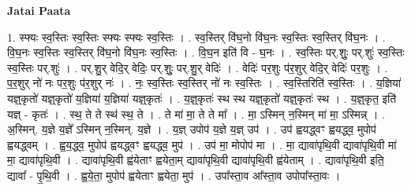 \documentclass[17pt]{extarticle}
\begin{document}
\textbf{Jatai Paata} \newline

1. स्फ्यः स्व॒स्तिः स्व॒स्तिः स्फ्यः स्फ्यः स्व॒स्तिः । . स्व॒स्तिर् वि॑घ॒नो वि॑घ॒नः स्व॒स्तिः स्व॒स्तिर् वि॑घ॒नः । . वि॒घ॒नः स्व॒स्तिः स्व॒स्तिर् वि॑घ॒नो वि॑घ॒नः स्व॒स्तिः । . वि॒घ॒न इति॑ वि - घ॒नः । . स्व॒स्तिः पर्.शुः॒ पर्.शुः॑ स्व॒स्तिः स्व॒स्तिः पर्.शुः॑ । . पर्.शु॒र् वेदि॒र् वेदिः॒ पर्.शुः॒ पर्.शु॒र् वेदिः॑ । . वेदिः॑ पर॒शुः प॑र॒शुर् वेदि॒र् वेदिः॑ पर॒शुः । . प॒र॒शुर् नो॑ नः पर॒शुः प॑र॒शुर् नः॑ । . नः॒ स्व॒स्तिः स्व॒स्तिर् नो॑ नः स्व॒स्तिः । . स्व॒स्तिरिति॑ स्व॒स्तिः । . य॒ज्ञिया॑ यज्ञ्॒कृतो॑ यज्ञ्॒कृतो॑ य॒ज्ञिया॑ य॒ज्ञिया॑ यज्ञ्॒कृतः॑ । . य॒ज्ञ्॒कृतः॑ स्थ स्थ यज्ञ्॒कृतो॑ यज्ञ्॒कृतः॑ स्थ । . य॒ज्ञ्॒कृत॒ इति॑ यज्ञ् - कृतः॑ । . स्थ॒ ते ते स्थ॑ स्थ॒ ते । . ते मा॑ मा॒ ते ते मा᳚ । . मा॒ ऽस्मिन् न॒स्मिन् मा॑ मा॒ ऽस्मिन्न् । . अ॒स्मिन्. य॒ज्ञे य॒ज्ञे᳚ ऽस्मिन् न॒स्मिन्. य॒ज्ञे । . य॒ज्ञ् उपोप॑ य॒ज्ञे य॒ज्ञ् उप॑ । . उप॑ ह्वयद्ध्वꣳ ह्वयद्ध्व॒ मुपोप॑ ह्वयद्ध्वम् । . ह्व॒य॒द्ध्व॒ मुपोप॑ ह्वयद्ध्वꣳ ह्वयद्ध्व॒ मुप॑ । . उप॑ मा॒ मोपोप॑ मा । . मा॒ द्यावा॑पृथि॒वी द्यावा॑पृथि॒वी मा॑ मा॒ द्यावा॑पृथि॒वी । . द्यावा॑पृथि॒वी ह्व॑येताꣳ ह्वयेता॒म् द्यावा॑पृथि॒वी द्यावा॑पृथि॒वी ह्व॑येताम् । . द्यावा॑पृथि॒वी इति॒ द्यावा᳚ - पृ॒थि॒वी । . ह्व॒ये॒ता॒ मुपोप॑ ह्वयेताꣳ ह्वयेता॒ मुप॑ । . उपा᳚स्ता॒व आ᳚स्ता॒व उपोपा᳚स्ता॒वः । \newline
\end{document}
